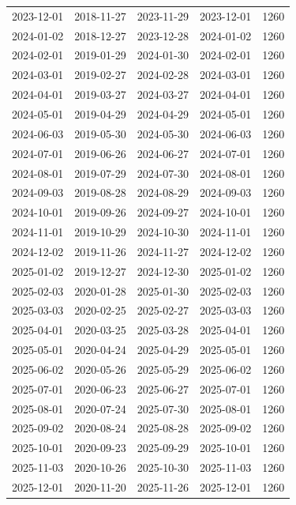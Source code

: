 \begin{tabular}{llllr}
2023-12-01 & 2018-11-27 & 2023-11-29 & 2023-12-01 & 1260 \\
2024-01-02 & 2018-12-27 & 2023-12-28 & 2024-01-02 & 1260 \\
2024-02-01 & 2019-01-29 & 2024-01-30 & 2024-02-01 & 1260 \\
2024-03-01 & 2019-02-27 & 2024-02-28 & 2024-03-01 & 1260 \\
2024-04-01 & 2019-03-27 & 2024-03-27 & 2024-04-01 & 1260 \\
2024-05-01 & 2019-04-29 & 2024-04-29 & 2024-05-01 & 1260 \\
2024-06-03 & 2019-05-30 & 2024-05-30 & 2024-06-03 & 1260 \\
2024-07-01 & 2019-06-26 & 2024-06-27 & 2024-07-01 & 1260 \\
2024-08-01 & 2019-07-29 & 2024-07-30 & 2024-08-01 & 1260 \\
2024-09-03 & 2019-08-28 & 2024-08-29 & 2024-09-03 & 1260 \\
2024-10-01 & 2019-09-26 & 2024-09-27 & 2024-10-01 & 1260 \\
2024-11-01 & 2019-10-29 & 2024-10-30 & 2024-11-01 & 1260 \\
2024-12-02 & 2019-11-26 & 2024-11-27 & 2024-12-02 & 1260 \\
2025-01-02 & 2019-12-27 & 2024-12-30 & 2025-01-02 & 1260 \\
2025-02-03 & 2020-01-28 & 2025-01-30 & 2025-02-03 & 1260 \\
2025-03-03 & 2020-02-25 & 2025-02-27 & 2025-03-03 & 1260 \\
2025-04-01 & 2020-03-25 & 2025-03-28 & 2025-04-01 & 1260 \\
2025-05-01 & 2020-04-24 & 2025-04-29 & 2025-05-01 & 1260 \\
2025-06-02 & 2020-05-26 & 2025-05-29 & 2025-06-02 & 1260 \\
2025-07-01 & 2020-06-23 & 2025-06-27 & 2025-07-01 & 1260 \\
2025-08-01 & 2020-07-24 & 2025-07-30 & 2025-08-01 & 1260 \\
2025-09-02 & 2020-08-24 & 2025-08-28 & 2025-09-02 & 1260 \\
2025-10-01 & 2020-09-23 & 2025-09-29 & 2025-10-01 & 1260 \\
2025-11-03 & 2020-10-26 & 2025-10-30 & 2025-11-03 & 1260 \\
2025-12-01 & 2020-11-20 & 2025-11-26 & 2025-12-01 & 1260 \\
\bottomrule
\end{tabular}
